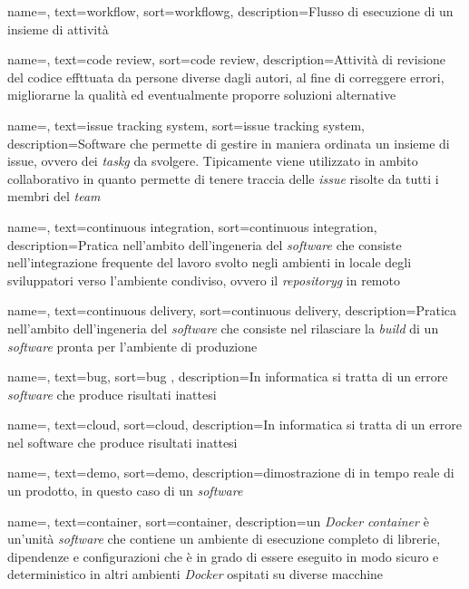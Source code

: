{
    name=,
    text=workflow,
    sort=workflowg,
    description={Flusso di esecuzione di un insieme di attività}
}

{
    name=,
    text=code review,
    sort=code review,
    description={Attività di revisione del codice effttuata da persone diverse dagli autori, al fine di correggere errori, migliorarne la qualità ed eventualmente proporre soluzioni alternative}
}

{
    name=,
    text=issue tracking system,
    sort=issue tracking system,
    description={Software che permette di gestire in maniera ordinata un insieme di issue, ovvero dei \textit{\gls{taskg}} da svolgere. Tipicamente viene utilizzato in ambito collaborativo in quanto permette di tenere traccia delle \textit{issue} risolte da tutti i membri del \textit{team}}
}

{
    name=,
    text=continuous integration,
    sort=continuous integration,
    description={Pratica nell'ambito dell'ingeneria del \textit{software} che consiste nell'integrazione frequente del lavoro svolto negli ambienti in locale degli sviluppatori verso l'ambiente condiviso, ovvero il \textit{\gls{repositoryg}} in remoto}
}

{
    name=,
    text=continuous delivery,
    sort=continuous delivery,
    description={Pratica nell'ambito dell'ingeneria del \textit{software} che consiste nel rilasciare la \textit{build} di un \textit{software} pronta per l'ambiente di produzione}
}

{
    name=,
    text=bug,
    sort=bug ,
    description={In informatica si tratta di un errore \textit{software} che produce risultati inattesi}
}

{
    name=,
    text=cloud,
    sort=cloud,
    description={In informatica si tratta di un errore nel software che produce risultati inattesi}
}

{
    name=,
    text=demo,
    sort=demo,
    description={dimostrazione di in tempo reale di un prodotto, in questo caso di un \textit{software}}
}

{
    name=,
    text=container,
    sort=container,
    description={un \textit{Docker} \textit{container} è un'unità \textit{software} che contiene un ambiente di esecuzione completo di librerie, dipendenze e configurazioni che è in grado di essere eseguito in modo sicuro e deterministico in altri ambienti \textit{Docker} ospitati su diverse macchine}
}


